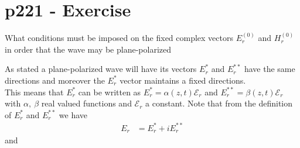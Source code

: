 \section{p221 - Exercise}
\begin{tcolorbox}
What conditions must be imposed on the fixed complex vectors $E^{(0)}_r$ and $H^{(0)}_r$ in order that the wave may be plane-polarized
\end{tcolorbox}
As stated a plane-polarized wave will have  its vectors $E^{*}_r$ and $E^{**}_r$ have the same directions and moreover the $E^{*}_r$ vector maintains a fixed directions.\\
This means that $E^{*}_r$ can be written as $E^{*}_r =  \alpha\left(z,t\right) \mathcal{E}_r$ and $E^{**}_r =  \beta\left(z,t\right) \mathcal{E}_r$ with $\alpha, \ \beta$  real valued functions and $\mathcal{E}_r$ a constant. 
Note that from the definition of $E^{*}_r$ and $E^{**}_r$ we have
\begin{align}
E^{}_r &= E^{*}_r+iE^{**}_r
\end{align}
and 
